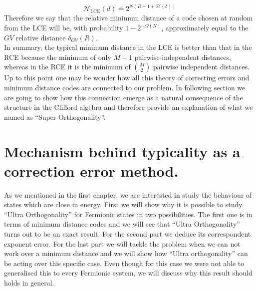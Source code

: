\begin{equation}
\mathcal{N}_{\mathrm{LCE}}(d) \doteq 2^{N(R-1+\mathcal{H}(\delta))}
\end{equation}
Therefore we say that the relative minimum distance of a code chosen at random from the LCE will be, with probability $1-2^{-\Omega(N)}$, approximately equal to the $GV$ relative distance $\delta_{GV}(R)$.\\
In summary, the typical minimum distance in the LCE is better than that in the RCE because the minimum of only $M-1$ pairwise-independent distances, whereas in the RCE it is the minimum of ${M\choose 2}$ pairwise independent distances.\\
Up to this point one may be wonder how all this theory of correcting errors and minimum distance codes are connected to our problem. In following section we are going to show how this connection emerge as a natural consequence of the structure in the Clifford algebra and therefore provide an explanation of what we named as ``Super-Orthogonality''.
\section{Mechanism behind typicality as a correction error method.}
As we mentioned in the first chapter, we are interested in study the behaviour of states which are close in energy. First we will show why it is possible to study ``Ultra Orthogonality'' for Fermionic states in two possibilities. The first one is in terms of minimum distance codes and we will see that ``Ultra Orthogonality'' turns out to be an exact result. For the second part we deduce its correspondent exponent error. For the last part we will tackle the problem when we can not work over a minimum distance and we will show how ``Ultra orthogonality'' can be acting over this specific case. Even though for this case we were not able to generalised this to every Fermionic system, we will discuss why this result should holds in general.\\

